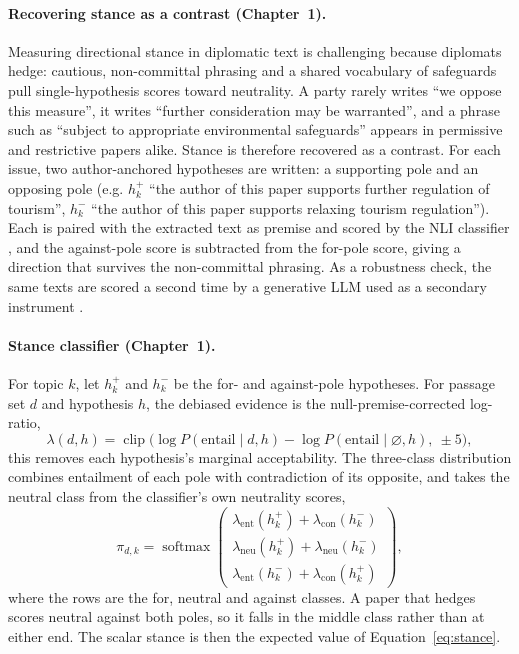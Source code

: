 \paragraph{Recovering stance as a contrast (Chapter~1).}
Measuring directional stance in diplomatic text is challenging because diplomats hedge: cautious,
non-committal phrasing and a shared vocabulary of safeguards pull single-hypothesis scores toward
neutrality. A party rarely writes ``we oppose this measure'', it writes ``further consideration
may be warranted'', and a phrase such as ``subject to appropriate environmental safeguards''
appears in permissive and restrictive papers alike. Stance is therefore recovered as a contrast.
For each issue, two author-anchored hypotheses are written: a supporting pole and an opposing
pole (e.g. $h_k^{+}$ ``the author of this paper supports further regulation of tourism'',
$h_k^{-}$ ``the author of this paper supports relaxing tourism regulation''). Each is paired with the extracted
text as premise and scored by the NLI classifier \parencite{Laurer2024}, and the against-pole
score is subtracted from the for-pole score, giving a direction that survives the non-committal
phrasing. As a robustness check, the same texts are scored a second time by a generative LLM used
as a secondary instrument \parencite{LeMens2024}.

\paragraph{Stance classifier (Chapter~1).}
For topic $k$, let $h_k^{+}$ and $h_k^{-}$ be the for- and against-pole hypotheses. For passage
set $d$ and hypothesis $h$, the debiased evidence is the null-premise-corrected log-ratio,
\[
  \lambda(d,h) = \operatorname{clip}\!\Big(
     \log P(\text{entail}\mid d,h) - \log P(\text{entail}\mid \varnothing,h),
     \ \pm 5 \Big),
\]
this removes each hypothesis's marginal acceptability. The three-class distribution combines
entailment of each pole with contradiction of its opposite, and takes the neutral class from the
classifier's own neutrality scores,
\[
  \pi_{d,k} = \operatorname{softmax}\!\begin{pmatrix}
     \lambda_{\mathrm{ent}}(h_k^{+}) + \lambda_{\mathrm{con}}(h_k^{-}) \\[2pt]
     \lambda_{\mathrm{neu}}(h_k^{+}) + \lambda_{\mathrm{neu}}(h_k^{-}) \\[2pt]
     \lambda_{\mathrm{ent}}(h_k^{-}) + \lambda_{\mathrm{con}}(h_k^{+})
  \end{pmatrix},
\]
where the rows are the for, neutral and against classes. A paper that hedges scores neutral
against both poles, so it falls in the middle class rather than at either end. The scalar stance
is then the expected value of Equation~\ref{eq:stance}.

